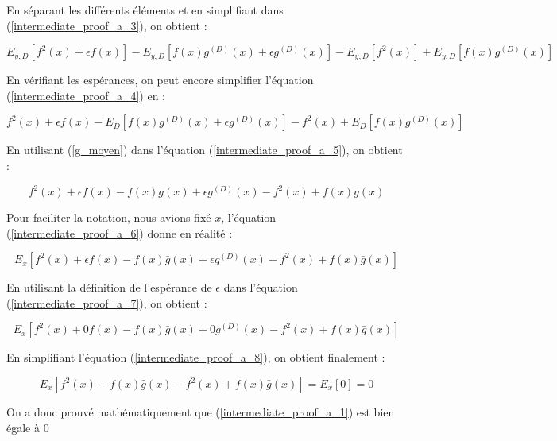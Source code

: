 \documentclass[a4paper]{article}
\begin{document}
\begin{appendices}
	En séparant les différents éléments et en simplifiant dans (\ref{intermediate_proof_a_3}), on obtient :
	
	\begin{equation}
		\label{intermediate_proof_a_4}
		E_{y,D} [f^2(x) + \epsilon f(x)] - E_{y,D}[f(x)g^{(D)}(x) + \epsilon g^{(D)}(x)] - E_{y,D}[f^2(x)] + E_{y,D}[f(x)g^{(D)}(x)]
	\end{equation}
	
	En vérifiant les espérances, on peut encore simplifier l'équation (\ref{intermediate_proof_a_4}) en :
	
	\begin{equation}
		\label{intermediate_proof_a_5}
		f^2(x) + \epsilon f(x) - E_D[f(x)g^{(D)}(x) + \epsilon g^{(D)}(x)] - f^2(x) + E_D[ f(x)g^{(D)}(x)]
	\end{equation}
	
	En utilisant (\ref{g_moyen}) dans l'équation (\ref{intermediate_proof_a_5}), on obtient :
	
	\begin{equation}
		\label{intermediate_proof_a_6}
		f^2(x) + \epsilon f(x) - f(x)\bar{g}(x) + \epsilon g^{(D)}(x) - f^2(x) + f(x)\bar{g}(x)
	\end{equation}
	
	Pour faciliter la notation, nous avions fixé $x$, l'équation (\ref{intermediate_proof_a_6})  donne en réalité :
	
	\begin{equation}
		\label{intermediate_proof_a_7}
		E_x[f^2(x) + \epsilon f(x) - f(x)\bar{g}(x) + \epsilon g^{(D)}(x) - f^2(x) + f(x)\bar{g}(x)]
	\end{equation}
	
	En utilisant la définition de l'espérance de $\epsilon$ dans l'équation (\ref{intermediate_proof_a_7}), on obtient :
	
	\begin{equation}
		\label{intermediate_proof_a_8}
		E_x[f^2(x) + 0 f(x) - f(x)\bar{g}(x) + 0 g^{(D)}(x) - f^2(x) + f(x)\bar{g}(x)]
	\end{equation}
	
	En simplifiant l'équation (\ref{intermediate_proof_a_8}), on obtient finalement :
	
	\begin{equation}
		\label{intermediate_proof_a_9}
		E_x[f^2(x) - f(x)\bar{g}(x) - f^2(x) + f(x)\bar{g}(x)] = E_x[0] = 0
	\end{equation}
	
	On a donc prouvé mathématiquement que (\ref{intermediate_proof_a_1}) est bien égale à 0
	\newpage
	

\end{appendices}
\end{document}
